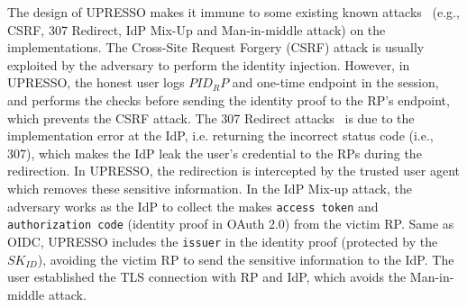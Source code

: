 The design of UPRESSO makes it immune to some existing known attacks~\cite{FettKS16} (e.g., CSRF, 307 Redirect, IdP Mix-Up and Man-in-middle attack) on the implementations. The Cross-Site Request Forgery (CSRF) attack is  usually exploited by the adversary to perform the identity injection. However, in UPRESSO, the honest user logs  $PID_RP$ and one-time endpoint in the session,  and performs the checks before sending the identity proof to the RP's endpoint, which prevents the CSRF attack.  The 307 Redirect attacks~\cite{FettKS16} is due to the implementation error at the IdP, i.e. returning the incorrect status code (i.e., 307), which makes the IdP leak the user's credential to the RPs during the redirection. In UPRESSO, the redirection is intercepted by the trusted user agent which removes these sensitive information. In the IdP Mix-up attack, the adversary works as the IdP to collect the makes \verb+access token+ and \verb+authorization code+ (identity proof in OAuth 2.0) from the victim RP. Same as OIDC, UPRESSO includes the \verb+issuer+ in the identity proof (protected by the $SK_{ID}$), avoiding the victim RP to send the sensitive information to the IdP. The user established the TLS connection with RP and IdP, which avoids the Man-in-middle attack.

